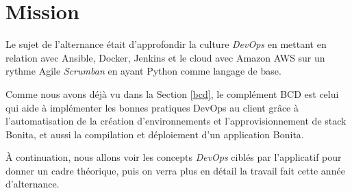 \section{Mission}
Le sujet de l'alternance était d'approfondir la culture \emph{DevOps} en mettant en relation avec Ansible, Docker, Jenkins et le cloud avec Amazon AWS sur un rythme Agile \textit{Scrumban} en ayant Python comme langage de base.

Comme nous avons déjà vu dans la Section \ref{bcd}, le complément BCD est celui qui aide à implémenter les bonnes pratiques DevOps au client grâce à l'automatisation de la création d'environnements et l'approvisionnement de stack Bonita, et aussi la compilation et déploiement d'un application Bonita.

À continuation, nous allons voir les concepts \emph{DevOps} ciblés par l'applicatif pour donner un cadre théorique, puis on verra plus en détail la travail fait cette année d'alternance.














